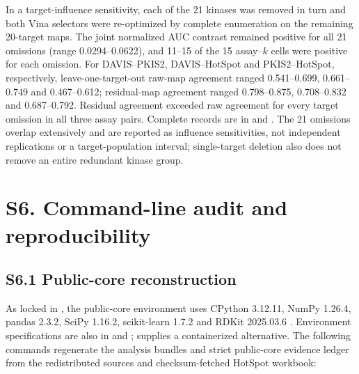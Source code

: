\documentclass[11pt]{article}
\begin{document}
In a target-influence sensitivity, each of the 21 kinases was removed in turn
and both Vina selectors were re-optimized by complete enumeration on the
remaining 20-target maps. The joint normalized AUC contrast remained positive
for all 21 omissions (range 0.0294--0.0622), and 11--15 of the 15 assay--$k$
cells were positive for each omission. For DAVIS--PKIS2, DAVIS--HotSpot and
PKIS2--HotSpot, respectively, leave-one-target-out raw-map agreement ranged
0.541--0.699, 0.661--0.749 and 0.467--0.612; residual-map agreement ranged
0.798--0.875, 0.708--0.832 and 0.687--0.792. Residual agreement exceeded raw
agreement for every target omission in all three assay pairs. Complete records
are in
and
.
The 21 omissions overlap extensively and are reported as influence
sensitivities, not independent replications or a target-population interval;
single-target deletion also does not remove an entire redundant kinase group.

\section*{S6. Command-line audit and reproducibility}

\subsection*{S6.1 Public-core reconstruction}

As locked in , the public-core environment uses CPython
3.12.11, NumPy 1.26.4, pandas 2.3.2, SciPy 1.16.2, scikit-learn 1.7.2 and RDKit
2025.03.6 \cite{numpy2020,scipy2020,rdkit2025}. Environment specifications are
also in  and ; 
supplies a containerized alternative.
The following commands regenerate the analysis bundles and strict public-core
evidence ledger from the redistributed sources and checksum-fetched HotSpot
workbook:
\end{document}
